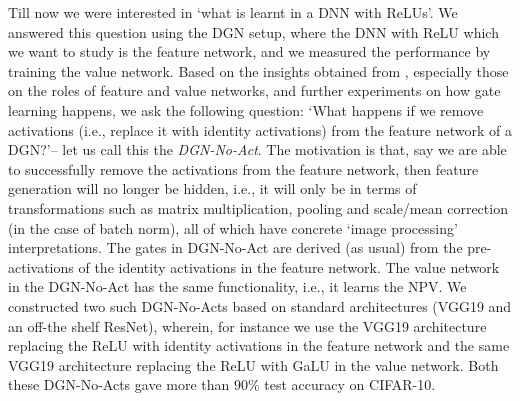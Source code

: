 Till now we were interested in `what is learnt in a DNN with ReLUs'. We answered this question using the DGN setup, where the DNN with ReLU which we want to study is the feature network, and we measured the performance by training the value network. Based on the insights obtained from , especially those on the roles of feature and value networks, and further experiments on how gate learning happens, we ask the following question: `What happens if we remove activations (i.e., replace it with identity activations) from the feature network of a DGN?'-- let us call this the \emph{DGN-No-Act}. The motivation is that, say we are able to successfully remove the activations from the feature network, then feature generation will no longer be hidden, i.e., it will only be in terms of transformations such as matrix multiplication, pooling and scale/mean correction (in the case of batch norm), all of which have concrete `image processing'  interpretations. The gates in DGN-No-Act are derived (as usual) from the pre-activations of the identity activations in the feature network. The value network in the DGN-No-Act has the same functionality, i.e., it learns the NPV. We constructed two such DGN-No-Acts based on standard architectures (VGG19 and an off-the shelf ResNet), wherein, for instance we use the VGG19 architecture replacing the ReLU with identity activations in the feature network and the same VGG19 architecture replacing the ReLU with GaLU in the value network. Both these DGN-No-Acts gave more than $90\%$ test accuracy on CIFAR-10.

